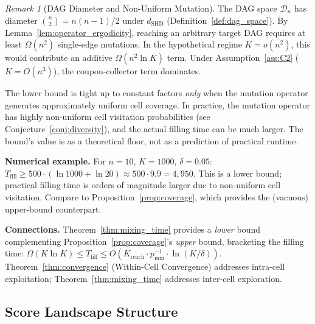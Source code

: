 \documentclass{article}
\theoremstyle{definition}
\theoremstyle{plain}
\theoremstyle{remark}
\newtheorem{remark}{Remark}
\begin{document}
\begin{remark}[DAG Diameter and Non-Uniform Mutation]
\label{rem:diameter}
The DAG space $\mathcal{D}_n$ has diameter $\binom{n}{2} = n(n-1)/2$ under $d_{\mathrm{SHD}}$
(Definition~\ref{def:dag_space}). By Lemma~\ref{lem:operator_ergodicity}, reaching an
arbitrary target DAG requires at least $\Omega(n^2)$ single-edge mutations. In the
hypothetical regime $K = o(n^2)$, this would contribute an additive $\Omega(n^2 \ln K)$
term. Under Assumption~\ref{ass:C2} ($K = O(n^3)$), the coupon-collector term dominates.

The lower bound is tight up to constant factors \emph{only} when the mutation operator
generates approximately uniform cell coverage. In practice, the mutation operator has
highly non-uniform cell visitation probabilities (see Conjecture~\ref{conj:diversity}),
and the actual filling time can be much larger. The bound's value is as a theoretical
floor, not as a prediction of practical runtime.
\end{remark}

\textbf{Numerical example.} For $n = 10$, $K = 1000$, $\delta = 0.05$:
$T_{\mathrm{fill}} \geq 500 \cdot (\ln 1000 + \ln 20) \approx 500 \cdot 9.9 = 4{,}950$.
This is a lower bound; practical filling time is orders of magnitude larger due to
non-uniform cell visitation. Compare to Proposition~\ref{prop:coverage}, which provides
the (vacuous) upper-bound counterpart.

\textbf{Connections.} Theorem~\ref{thm:mixing_time} provides a \emph{lower} bound
complementing Proposition~\ref{prop:coverage}'s \emph{upper} bound, bracketing the filling
time: $\Omega(K \ln K) \leq T_{\mathrm{fill}} \leq O(K_{\mathrm{reach}} \cdot p_{\min}^{-1}
\cdot \ln(K/\delta))$. Theorem~\ref{thm:convergence} (Within-Cell Convergence) addresses
intra-cell exploitation; Theorem~\ref{thm:mixing_time} addresses inter-cell exploration.


\subsection{Score Landscape Structure}
\label{subsec:score_landscape}
\end{document}
